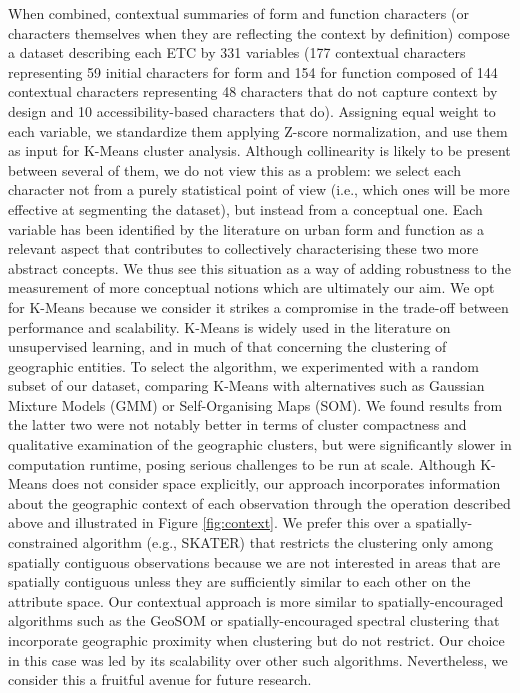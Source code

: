 \documentclass[fleqn,10pt]{wlscirep}
\begin{document}

When combined, contextual summaries of form and function characters (or characters
themselves when they are reflecting the context by definition) compose a dataset
describing each ETC by 331 variables (177 contextual characters representing 59 initial
characters for form and 154 for function composed of 144 contextual characters
representing 48 characters that do not capture context by design and 10
accessibility-based characters that do).
Assigning equal weight to each variable, we standardize them applying
Z-score normalization, and use them as input for K-Means cluster analysis.
Although collinearity is likely to be present between several of them, we do
not view this as a problem: we select each character not from a purely
statistical point of view (i.e., which ones will be more effective at
segmenting the dataset), but instead from a conceptual one. Each variable has
been identified by the literature on urban form and function as a relevant
aspect that contributes to collectively characterising these two more abstract
concepts. We thus see this situation as a way of adding robustness to the
measurement of more conceptual notions which are ultimately our aim.
We opt for K-Means because we consider it strikes a compromise in
the trade-off between performance and scalability. K-Means is widely used in the literature on
unsupervised learning, and in much of that concerning the clustering of
geographic entities\cite{webber2018predictive}.
To select the algorithm, we experimented with a random subset of our dataset,
comparing K-Means with alternatives such as Gaussian
Mixture Models (GMM) or Self-Organising Maps (SOM). We found results from the
latter two were not notably better in terms of cluster compactness and qualitative examination
of the geographic clusters, but were significantly slower in computation
runtime, posing serious challenges to be run at scale.
Although K-Means does not consider space explicitly, our approach incorporates
information about the geographic context of each observation through the
operation described above and illustrated in Figure \ref{fig:context}. We
prefer this over a spatially-constrained algorithm (e.g.,
SKATER\cite{lage2001minimal}) that restricts the clustering only among spatially contiguous observations
because we are not interested in areas that are spatially contiguous unless
they are sufficiently similar to each other on the attribute space. Our
contextual approach is more similar to spatially-encouraged algorithms such as the
GeoSOM\cite{baccao2005self} or spatially-encouraged spectral clustering\cite{wolf2021spatially} that incorporate geographic proximity when
clustering but do not restrict. Our choice in this case was led by its
scalability over other such algorithms.
Nevertheless, we consider this a fruitful avenue for future research.
\end{document}
